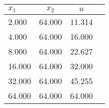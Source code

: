 \begin{tabular}{l|ccc}
\toprule
$x_1$ & $x_2$ & $u$ \\
\midrule
2.000 & 64.000 & 11.314 \\
4.000 & 64.000 & 16.000 \\
8.000 & 64.000 & 22.627 \\
16.000 & 64.000 & 32.000 \\
32.000 & 64.000 & 45.255 \\
64.000 & 64.000 & 64.000 \\
\bottomrule
\end{tabular}
